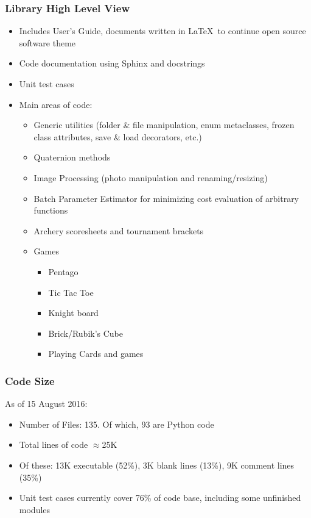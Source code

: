 \documentclass{beamer}
\begin{document}
\begin{frame}
    \frametitle{Library High Level View}
    \begin{itemize}
        \item Includes User's Guide, documents written in \LaTeX\  to continue open source software theme
        \item Code documentation using Sphinx and docstrings
        \item Unit test cases
        \item Main areas of code:
        \begin{itemize}
            \item Generic utilities (folder \& file manipulation, enum metaclasses, frozen class attributes, save \& load decorators, etc.)
            \item Quaternion methods
            \item Image Processing (photo manipulation and renaming/resizing)
            \item Batch Parameter Estimator for minimizing cost evaluation of arbitrary functions
            \item Archery scoresheets and tournament brackets
            \item Games
            \begin{itemize}
                \item Pentago
                \item Tic Tac Toe
                \item Knight board
                \item Brick/Rubik's Cube
                \item Playing Cards and games
            \end{itemize}
        \end{itemize}
    \end{itemize}
\end{frame}

\begin{frame}
    \frametitle{Code Size}
    As of 15 August 2016:
    \begin{itemize}
        \item Number of Files: 135.  Of which, 93 are Python code
        \item Total lines of code $\approx$25K
        \item Of these: 13K executable (52\%), 3K blank lines (13\%), 9K comment lines (35\%)
        \item Unit test cases currently cover 76\% of code base, including some unfinished modules
    \end{itemize}
\end{frame}
\end{document}
